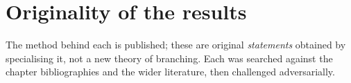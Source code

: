 \chapter*{Originality of the results}
\label{oi:details}
\begingroup
\setlength{\parindent}{0pt}
\setlength{\parskip}{0.25\baselineskip}
\setlength{\tabcolsep}{4.5pt}

\label{oi:statements}

{\footnotesize\noindent
The method behind each is published; these are original \emph{statements} obtained by
specialising it, not a new theory of branching. Each was searched against the chapter
bibliographies and the wider literature, then challenged adversarially.\par}

